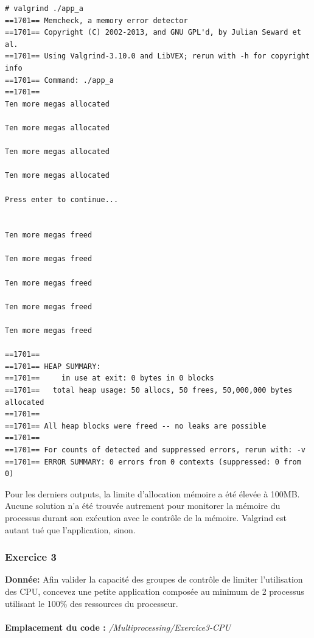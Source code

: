 \begin{lstlisting}
# valgrind ./app_a 
==1701== Memcheck, a memory error detector
==1701== Copyright (C) 2002-2013, and GNU GPL'd, by Julian Seward et al.
==1701== Using Valgrind-3.10.0 and LibVEX; rerun with -h for copyright info
==1701== Command: ./app_a
==1701== 
Ten more megas allocated

Ten more megas allocated

Ten more megas allocated

Ten more megas allocated

Press enter to continue...


Ten more megas freed

Ten more megas freed

Ten more megas freed

Ten more megas freed

Ten more megas freed

==1701== 
==1701== HEAP SUMMARY:
==1701==     in use at exit: 0 bytes in 0 blocks
==1701==   total heap usage: 50 allocs, 50 frees, 50,000,000 bytes allocated
==1701== 
==1701== All heap blocks were freed -- no leaks are possible
==1701== 
==1701== For counts of detected and suppressed errors, rerun with: -v
==1701== ERROR SUMMARY: 0 errors from 0 contexts (suppressed: 0 from 0)
\end{lstlisting}
Pour les derniers outputs, la limite d'allocation mémoire a été élevée à 100MB. Aucune solution n'a été trouvée autrement pour monitorer la mémoire du processus durant son exécution avec le contrôle de la mémoire. Valgrind est autant tué que l'application, sinon.

\subsubsection{Exercice 3}
\textbf{Donnée:} Afin	valider	la	capacité	des	groupes	de	contrôle	de	limiter	l’utilisation	des	CPU,	concevez	une	petite	application	composée	au	minimum	de	2	processus	utilisant	le	100\%	des	ressources	du	processeur.	\\\\

\textbf{Emplacement du code : } \textit{/Multiprocessing/Exercice3-CPU}\\

